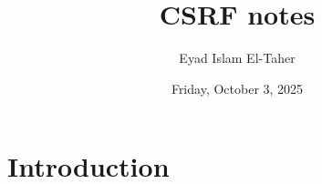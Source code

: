 \documentclass{article}
\title{CSRF notes}
\date{Friday, October 3, 2025}
\author{Eyad Islam El-Taher}
\begin{document}
\maketitle

\section*{Introduction}
\end{document}
